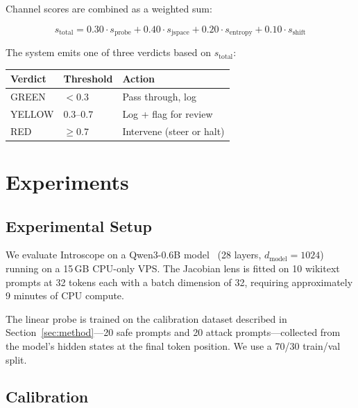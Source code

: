 \documentclass[11pt,twocolumn]{article}
\begin{document}
Channel scores are combined as a weighted sum:

\begin{equation}
s_{\text{total}} = 0.30 \cdot s_{\text{probe}} + 0.40 \cdot s_{\text{jspace}} + 0.20 \cdot s_{\text{entropy}} + 0.10 \cdot s_{\text{shift}}
\label{eq:aggregate}
\end{equation}

The system emits one of three verdicts based on $s_{\text{total}}$:

\begin{center}
\begin{tabular}{lll}
\toprule
\textbf{Verdict} & \textbf{Threshold} & \textbf{Action} \\
\midrule
GREEN & $< 0.3$ & Pass through, log \\
YELLOW & $0.3$--$0.7$ & Log + flag for review \\
RED & $\geq 0.7$ & Intervene (steer or halt) \\
\bottomrule
\end{tabular}
\end{center}

\section{Experiments}

\label{sec:experiments}

\subsection{Experimental Setup}

We evaluate Introscope on a Qwen3-0.6B model~\cite{qwen3} (28 layers, $d_{\text{model}} = 1024$) running on a 15\,GB CPU-only VPS. The Jacobian lens is fitted on 10 wikitext prompts at 32 tokens each with a batch dimension of 32, requiring approximately 9 minutes of CPU compute.

The linear probe is trained on the calibration dataset described in Section~\ref{sec:method}---20 safe prompts and 20 attack prompts---collected from the model's hidden states at the final token position. We use a 70/30 train/val split.

\subsection{Calibration}
\end{document}
